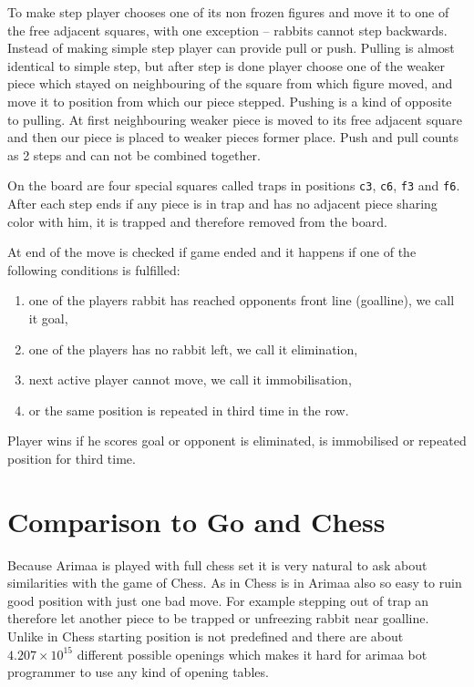 To make step player chooses one of its non frozen figures and move it to one of
the free adjacent squares, with one exception -- rabbits cannot step backwards.
Instead of making simple step player can provide pull or push. Pulling is
almost identical to simple step, but after step is done player choose one of
the weaker piece which stayed on neighbouring of the square from which figure
moved, and move it to position from which our piece stepped. Pushing is a kind
of opposite to pulling. At first neighbouring weaker piece is moved to its free
adjacent square and then our piece is placed to weaker pieces former place.
Push and pull counts as 2 steps and can not be combined together.

On the board are four special squares called traps in positions \texttt{c3},
\texttt{c6}, \texttt{f3} and \texttt{f6}. After each step ends if any piece is
in trap and has no adjacent piece sharing color with him, it is trapped and
therefore removed from the board.

At end of the move is checked if game ended and it happens if one of the
following conditions is fulfilled:
\begin{enumerate}
\item one of the players rabbit has reached opponents front line (goalline), we
call it goal,
\item one of the players has no rabbit left, we call it elimination,
\item next active player cannot move, we call it immobilisation,
\item or the same position is repeated in third time in the row.
\end{enumerate}

Player wins if he scores goal or opponent is eliminated, is immobilised or
repeated position for third time.


\section{Comparison to Go and Chess}
Because Arimaa is played with full chess set it is very natural to ask about
similarities with the game of Chess. As in Chess is in Arimaa also so easy to
ruin good position with just one bad move. For example stepping out of trap an
therefore let another piece to be trapped or unfreezing rabbit near goalline.
Unlike in Chess starting position is not predefined and there are about
$4.207\times10^{15}$ different possible openings which makes it hard for arimaa
bot programmer to use any kind of opening tables\cite{COX}.

